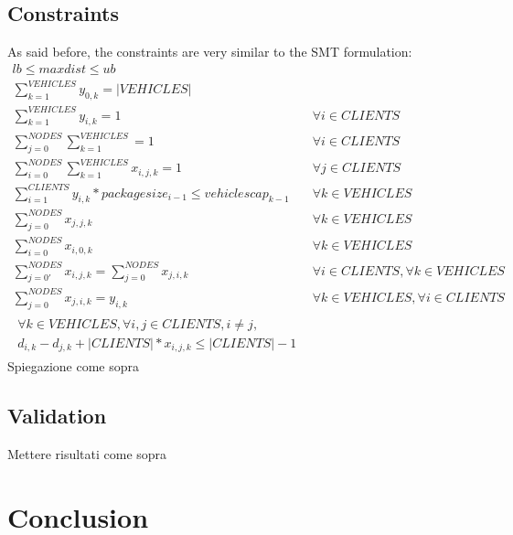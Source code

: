 \documentclass{article}
\begin{document}
\subsection{Constraints}
As said before, the constraints are very similar to the SMT formulation:
\begin{align}
	lb \le maxdist \le ub \label{eq:10} \\
	\sum_{k=1}^{VEHICLES}y_{0,k} = |VEHICLES|\\
	\sum_{k=1}^{VEHICLES}y_{i,k} = 1 \quad & \forall i \in CLIENTS \\
	\sum_{j=0}^{NODES}\sum_{k=1}^{VEHICLES} = 1\ \quad & \forall i \in CLIENTS \\
	\sum_{i=0}^{NODES}\sum_{k=1}^{VEHICLES}x_{i,j,k} = 1 \quad & \forall j \in CLIENTS \\
	\sum_{i=1}^{CLIENTS} y_{i,k}*packagesize_{i-1} \le vehiclescap_{k-1} \quad & \forall k \in VEHICLES \\
	\sum_{j=0}^{NODES} x_{j,j,k} \quad & \forall k \in VEHICLES \\
	\sum_{i=0}^{NODES} x_{i,0,k} \quad & \forall k \in VEHICLES \\
	\sum_{j=0'}^{NODES} x_{i,j,k} = \sum_{j = 0}^{NODES} x_{j,i,k} \quad & \forall i \in CLIENTS, \forall k \in VEHICLES \\
	\sum_{j=0}^{NODES}x_{j,i,k} = y_{i,k} \quad & \forall k \in VEHICLES, \forall i \in CLIENTS \\
	\begin{aligned}
	\forall k \in VEHICLES, \forall i,j \in CLIENTS, i \ne j,\\ d_{i,k} - d_{j,k} + |CLIENTS| * x_{i,j,k} \le |CLIENTS| -1
	\end{aligned}
\end{align}
Spiegazione come sopra
\subsection{Validation}
Mettere risultati come sopra
\section{Conclusion}
\end{document}
